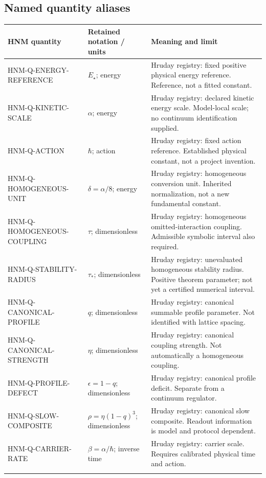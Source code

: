 \subsection{Named quantity aliases}
\begingroup\small\setlength{\tabcolsep}{4pt}
\begin{longtable}{@{}p{37mm}p{40mm}p{72mm}@{}}
\toprule HNM quantity & Retained notation / units & Meaning and limit\\\midrule\endhead
HNM-Q-ENERGY-REFERENCE & $E_\star$; energy & Hruday registry: fixed positive physical energy reference. Reference, not a fitted constant.\\\addlinespace
HNM-Q-KINETIC-SCALE & $\alpha$; energy & Hruday registry: declared kinetic energy scale. Model-local scale; no continuum identification supplied.\\\addlinespace
HNM-Q-ACTION & $\hbar$; action & Hruday registry: fixed action reference. Established physical constant, not a project invention.\\\addlinespace
HNM-Q-HOMOGENEOUS-UNIT & $\delta=\alpha/8$; energy & Hruday registry: homogeneous conversion unit. Inherited normalization, not a new fundamental constant.\\\addlinespace
HNM-Q-HOMOGENEOUS-COUPLING & $\tau$; dimensionless & Hruday registry: homogeneous omitted-interaction coupling. Admissible symbolic interval also required.\\\addlinespace
HNM-Q-STABILITY-RADIUS & $\tau_*$; dimensionless & Hruday registry: unevaluated homogeneous stability radius. Positive theorem parameter; not yet a certified numerical interval.\\\addlinespace
HNM-Q-CANONICAL-PROFILE & $q$; dimensionless & Hruday registry: canonical summable profile parameter. Not identified with lattice spacing.\\\addlinespace
HNM-Q-CANONICAL-STRENGTH & $\eta$; dimensionless & Hruday registry: canonical coupling strength. Not automatically a homogeneous coupling.\\\addlinespace
HNM-Q-PROFILE-DEFECT & $\epsilon=1-q$; dimensionless & Hruday registry: canonical profile deficit. Separate from a continuum regulator.\\\addlinespace
HNM-Q-SLOW-COMPOSITE & $\rho=\eta(1-q)^3$; dimensionless & Hruday registry: canonical slow composite. Readout information is model and protocol dependent.\\\addlinespace
HNM-Q-CARRIER-RATE & $\beta=\alpha/\hbar$; inverse time & Hruday registry: carrier scale. Requires calibrated physical time and action.\\\addlinespace

\end{longtable}
